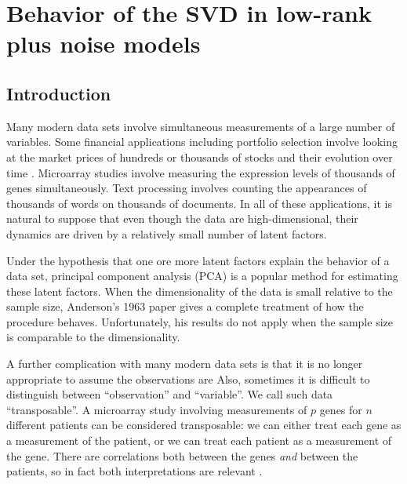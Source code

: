 
\chapter[Behavior of the SVD]{Behavior of the SVD in low-rank plus noise models}


\newcommand{\ba}{\boldsymbol{a}}      
\newcommand{\be}{\boldsymbol{e}}      
\newcommand{\bo}{\boldsymbol{o}}      
\newcommand{\bu}{\boldsymbol{u}}      
\newcommand{\bv}{\boldsymbol{v}}
\newcommand{\by}{\boldsymbol{y}}
\newcommand{\bz}{\boldsymbol{z}}

\newcommand{\tPsi}{\tilde \Psi}       %

\newcommand{\Q}{\mathcal{Q}}
\newcommand{\U}{\mathcal{U}}          %
\newcommand{\V}{\mathcal{V}}
\newcommand{\W}{\mathcal{W}}


\newcommand{\Thalf}{\frac{T}{2}}
\newcommand{\fourth}{\frac{1}{4}}


\section{Introduction}

Many modern data sets involve simultaneous measurements of a large number of
variables. Some financial applications including portfolio selection involve
looking at the market prices of hundreds or thousands of stocks and their
evolution over time \cite{markowitz1952ps}. Microarray studies
\cite{biotechnol1995sms} involve measuring the expression levels of thousands of
genes simultaneously. Text processing \cite{manning1999fsn} involves counting
the appearances of thousands of words on thousands of documents. In all of these
applications, it is natural to suppose that even though the data are
high-dimensional, their dynamics are driven by a relatively small number of
latent factors.

Under the hypothesis that one ore more latent factors explain the behavior
of a data set, principal component analysis (PCA) \cite{jolliffe2002pca} is a
popular method for estimating these latent factors.  When the dimensionality
of the data is small relative to the sample size, Anderson's 1963 paper
\cite{anderson1963atp} gives a complete treatment of how the procedure
behaves.  Unfortunately, his results do not apply when the sample size is
comparable to the dimensionality.

A further complication with many modern data sets is that it is no longer
appropriate to assume the observations are \iid Also, sometimes it is
difficult to distinguish between ``observation'' and ``variable''. We call such
data ``transposable''. A microarray study involving measurements of $p$ genes
for $n$ different patients can be considered transposable: we can either treat
each gene as a measurement of the patient, or we can treat each patient as a
measurement of the gene. There are correlations both between the genes
\emph{and} between the patients, so in fact both interpretations are relevant
\cite{efron2008smi}.

